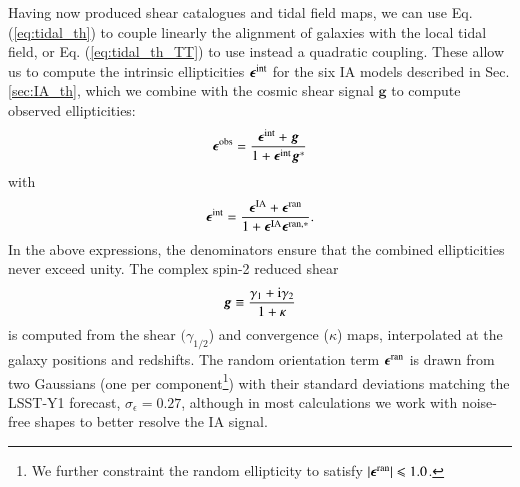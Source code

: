 Having now produced shear catalogues and tidal field maps, we can use Eq. (\ref{eq:tidal_th}) to couple linearly the alignment of galaxies with the local tidal field, or Eq. (\ref{eq:tidal_th_TT}) to use instead a quadratic coupling. These allow us to compute the intrinsic ellipticities ${\boldsymbol \epsilon}^{\rm int}$ for the six IA models described in Sec. \ref{sec:IA_th}, which we combine with the cosmic shear signal ${\boldsymbol g}$ to compute observed ellipticities: 
\begin{equation}
{\boldsymbol \epsilon}^{\rm obs} = \frac{{\boldsymbol \epsilon}^{\rm int} + {\boldsymbol g}}{1 + {\boldsymbol \epsilon}^{\rm int}{\boldsymbol g^*}} 
\label{eq:eps_obs}
\end{equation}
with
\begin{equation}
{\boldsymbol \epsilon}^{\rm int}  = \frac{{\boldsymbol \epsilon}^{\rm IA} + {\boldsymbol \epsilon}^{\rm ran}}{1 + {\boldsymbol \epsilon}^{\rm IA}{\boldsymbol \epsilon^{\rm ran, *}}}.
\label{eq:eps_int}
\end{equation}
In the above expressions, the denominators ensure that the combined  ellipticities never exceed unity.
The complex spin-2 reduced shear
\begin{equation}
{\boldsymbol g} \equiv \frac{\gamma_1 + {\rm i} \gamma_2}{1 + \kappa}
\end{equation}
is computed from the shear  $(\gamma_{1/2}$) and convergence ($\kappa$) maps, interpolated at the galaxy positions and redshifts. 
The random orientation term ${\boldsymbol \epsilon}^{\rm ran}$ is drawn from two Gaussians (one per component\footnote{We further constraint  the random ellipticity to satisfy $|{\boldsymbol \epsilon}^{\rm ran}| \le 1.0$.}) with their standard deviations matching the LSST-Y1 forecast, $\sigma_{\epsilon} = 0.27$, although in most calculations we work with noise-free shapes to better resolve the IA signal.  
